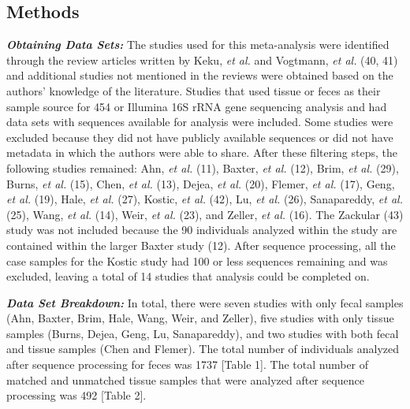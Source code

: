 \documentclass[12pt,]{article}
\begin{document}
\newpage

\subsection{Methods}\label{methods}

\textbf{\emph{Obtaining Data Sets:}} The studies used for this
meta-analysis were identified through the review articles written by
Keku, \emph{et al.} and Vogtmann, \emph{et al.} (40, 41) and additional
studies not mentioned in the reviews were obtained based on the authors'
knowledge of the literature. Studies that used tissue or feces as their
sample source for 454 or Illumina 16S rRNA gene sequencing analysis and
had data sets with sequences available for analysis were included. Some
studies were excluded because they did not have publicly available
sequences or did not have metadata in which the authors were able to
share. After these filtering steps, the following studies remained: Ahn,
\emph{et al.} (11), Baxter, \emph{et al.} (12), Brim, \emph{et al.}
(29), Burns, \emph{et al.} (15), Chen, \emph{et al.} (13), Dejea,
\emph{et al.} (20), Flemer, \emph{et al.} (17), Geng, \emph{et al.}
(19), Hale, \emph{et al.} (27), Kostic, \emph{et al.} (42), Lu, \emph{et
al.} (26), Sanapareddy, \emph{et al.} (25), Wang, \emph{et al.} (14),
Weir, \emph{et al.} (23), and Zeller, \emph{et al.} (16). The Zackular
(43) study was not included because the 90 individuals analyzed within
the study are contained within the larger Baxter study (12). After
sequence processing, all the case samples for the Kostic study had 100
or less sequences remaining and was excluded, leaving a total of 14
studies that analysis could be completed on.

\textbf{\emph{Data Set Breakdown:}} In total, there were seven studies
with only fecal samples (Ahn, Baxter, Brim, Hale, Wang, Weir, and
Zeller), five studies with only tissue samples (Burns, Dejea, Geng, Lu,
Sanapareddy), and two studies with both fecal and tissue samples (Chen
and Flemer). The total number of individuals analyzed after sequence
processing for feces was 1737 {[}Table 1{]}. The total number of matched
and unmatched tissue samples that were analyzed after sequence
processing was 492 {[}Table 2{]}.
\end{document}

